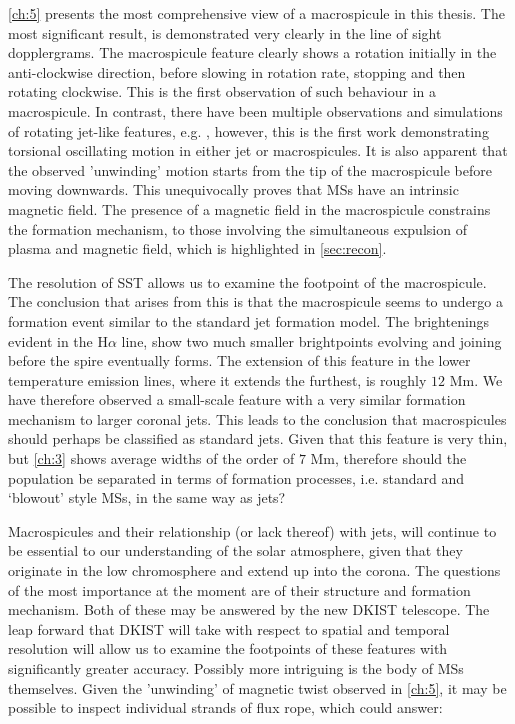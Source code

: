 \cref{ch:5} presents the most comprehensive view of a macrospicule in this thesis.
The most significant result, is demonstrated very clearly in the line of sight dopplergrams.
The macrospicule feature clearly shows a rotation initially in the anti-clockwise direction, before slowing in rotation rate, stopping and then rotating clockwise.
This is the first observation of such behaviour in a macrospicule.
In contrast, there have been multiple observations and simulations of rotating jet-like features, e.g. \cite{Kamio2010, Curdt2011, Majarska2011}, however, this is the first work demonstrating torsional oscillating motion in either jet or macrospicules.
It is also apparent that the observed 'unwinding' motion starts from the tip of the macrospicule before moving downwards.  
This unequivocally proves that MSs have an intrinsic magnetic field.
The presence of a magnetic field in the macrospicule constrains the formation mechanism, to those involving the simultaneous expulsion of plasma and magnetic field, which is highlighted in \cref{sec:recon}.

The resolution of SST allows us to examine the footpoint of the macrospicule.
The conclusion that arises from this is that the macrospicule seems to undergo a formation event similar to the \cite{Shibata1992} standard jet formation model.
The brightenings evident in the H$\alpha$ line, show two much smaller brightpoints evolving and joining before the spire eventually forms.
The extension of this feature in the lower temperature emission lines, where it extends the furthest, is roughly $12$ Mm.
We have therefore observed a small-scale feature with a very similar formation mechanism to larger coronal jets.
This leads to the conclusion that macrospicules should perhaps be classified as standard jets.
Given that this feature is very thin, but \cref{ch:3} shows average widths of the order of $7$ Mm, therefore should the population be separated in terms of formation processes, i.e. standard and `blowout' style MSs, in the same way as jets?

Macrospicules and their relationship (or lack thereof) with jets, will continue to be essential to our understanding of the solar atmosphere, given that they originate in the low chromosphere and extend up into the corona.
The questions of the most importance at the moment are of their structure and formation mechanism.
Both of these may be answered by the new DKIST telescope.
The leap forward that DKIST will take with respect to spatial and temporal resolution will allow us to examine the footpoints of these features with significantly greater accuracy.
Possibly more intriguing is the body of MSs themselves.
Given the 'unwinding' of magnetic twist observed in \cref{ch:5}, it may be possible to inspect individual strands of flux rope, which could answer:

